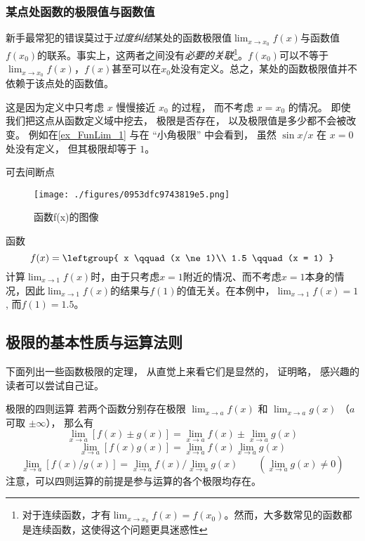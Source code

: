 \subsubsection{某点处函数的极限值与函数值}
新手最常犯的错误莫过于\textsl{过度纠结}某处的函数极限值$\lim_{x\to x_0} f(x)$与函数值$f(x_0)$的联系。事实上，这两者之间没有\textsl{必要的关联}\footnote{对于连续函数，才有$\lim_{x\to x_0} f(x)=f(x_0)$。然而，大多数常见的函数都是连续函数，这使得这个问题更具迷惑性}。$f(x_0)$可以不等于$\lim_{x\to x_0} f(x)$，$f(x)$甚至可以在$x_0$处没有定义。总之，某处的函数极限值并不依赖于该点处的函数值。

这是因为定义中只考虑 $x$ 慢慢接近 $x_0$ 的过程， 而不考虑 $x = x_0$ 的情况。 即使我们把这点从函数定义域中挖去， 极限是否存在， 以及极限值是多少都不会被改变。 例如在\autoref{ex_FunLim_1} 与在 “小角极限” 中会看到， 虽然 $\sin x/ x$ 在 $x = 0$ 处没有定义， 但其极限却等于 $1$。

\begin{example}{可去间断点}
\begin{figure}[ht]
\centering
\texttt{[image: ./figures/0953dfc9743819e5.png]}
\caption{函数f(x)的图像} \label{fig_FunLim_4}
\end{figure}
函数
\begin{equation}
f(x) = \leftgroup{
x \qquad (x \ne 1)\\
1.5 \qquad (x = 1)
}\end{equation}
计算$\lim_{x\to 1} f(x)$时，由于只考虑$x=1$附近的情况、而不考虑$x=1$本身的情况，因此$\lim_{x\to 1} f(x)$的结果与$f(1)$的值无关。在本例中，$\lim_{x\to 1} f(x)=1$, 而$f(1)=1.5$。
\end{example}

\subsection{极限的基本性质与运算法则}
下面列出一些函数极限的定理， 从直觉上来看它们是显然的， 证明略， 感兴趣的读者可以尝试自己证。
\begin{theorem}{极限的四则运算}
若两个函数分别存在极限 $\lim_{x\to a} f(x)$ 和 $\lim_{x\to a} g(x)$ （$a$ 可取 $\pm \infty$）， 那么有
\begin{equation}
\lim_{x\to a} [f(x) \pm g(x)] = \lim_{x\to a}f(x) \pm  \lim_{x\to a} g(x)
\end{equation}
\begin{equation}
\lim_{x\to a} [f(x) g(x)] = \lim_{x\to a}f(x) \lim_{x\to a} g(x)
\end{equation}
\begin{equation}
\lim_{x\to a} [f(x)/g(x)] = \lim_{x\to a}f(x)/\lim_{x\to a} g(x) \qquad (\lim_{x\to a} g(x) \ne 0)
\end{equation}
注意，可以四则运算的前提是参与运算的各个极限均存在。
\end{theorem}

